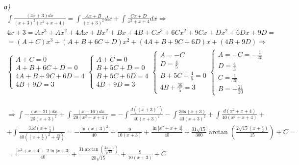 \documentclass[a4paper,11pt]{article}
\begin{document}
\textsl{а) }
\begin{gather*}
	\int \frac{(4x + 3)dx}{(x + 3)^2(x^2 + x + 4)} = \int \frac{Ax + B}{(x + 3)^2}dx + \int \frac{Cx + D}{x^2 + x + 4}dx \Rightarrow \\[2pt]
	4x + 3 = Ax^3 + Ax^2 + 4Ax + Bx^2 + Bx + 4B + Cx^3 + 6Cx^2 + 9Cx + Dx^2 + 6Dx + 9D = \\[2pt]
	= (A + C)x^3 + (A + B + 6C + D)x^2 + (4A + B + 9C + 6D)x + (4B + 9D) \Rightarrow
\end{gather*}
\begin{gather*}
\begin{cases}
A + C = 0 \\
A + B + 6C + D = 0 \\
4A + B + 9C + 6D = 4 \\
4B + 9D = 3	
\end{cases}
\begin{cases}
A + C = 0 \\
B + 5C + D = 0 \\
B + 5C + 6D = 4 \\
4B + 9D = 3	
\end{cases}
\begin{cases}
A = -C \\
D = \frac45 \\
B + 5C + \frac45 = 0\\
4B + \frac{36}5 = 3	
\end{cases}
\begin{cases}
A = -C = -\frac1{20}\\
D = \frac45 \\
C = \frac1{20} \\
B = -\frac{21}{20}
\end{cases}
\end{gather*}

\begin{gather*}
	\Rightarrow \int -\frac{(x + 21 )dx}{20(x + 3)^2} + \int \frac{(x + 16)dx}{20(x^2 + x + 4)} = 
	- \int \frac{d((x + 3)^2)}{40(x + 3)^2} - \int \frac{36d(x + 3)}{40(x + 3)^2} + \int \frac{d(x^2 + x + 4)}{40(x^2 + x + 4)} + \\[2pt] +  \int \frac{31d(x + \frac12)}{40((x + \frac12)^2 + \frac{15}4)} = - \frac{\ln (x + 3)^2}{40} + \frac{9}{10(x + 3)} + \frac{\ln |x^2 + x + 4|}{40} + \frac{31\sqrt{15}}{300}\arctan(\frac{2\sqrt{15}(x + \frac12)}{15}) + C =\\[2pt] = \frac{|x^2 + x + 4| - 2\ln|x + 3|}{40} + \frac{31\arctan(\frac{2x + 1}{\sqrt{15}})}{20\sqrt{15}} + \frac9{10(x + 3)} + C
\end{gather*}
\end{document}
